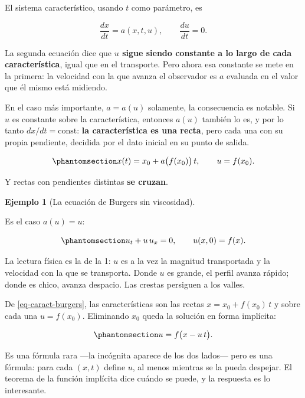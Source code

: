 \documentclass[
  spanish,
  a4paper,
]{scrbook}
\theoremstyle{definition}
\theoremstyle{plain}
\theoremstyle{definition}
\newtheorem{example}{Ejemplo}[chapter]
\theoremstyle{plain}
\theoremstyle{definition}
\theoremstyle{remark}
\begin{document}
El sistema característico, usando \(t\) como parámetro, es

\[
\frac{dx}{dt} = a(x,t,u), \qquad \frac{du}{dt} = 0 .
\]

La segunda ecuación dice que \textbf{\(u\) sigue siendo constante a lo
largo de cada característica}, igual que en el transporte. Pero ahora
esa constante se mete en la primera: la velocidad con la que avanza el
observador es \(a\) evaluada en el valor que él mismo está midiendo.

En el caso más importante, \(a = a(u)\) solamente, la consecuencia es
notable. Si \(u\) es constante sobre la característica, entonces
\(a(u)\) también lo es, y por lo tanto \(dx/dt = \text{const}\):
\textbf{la característica es una recta}, pero cada una con su propia
pendiente, decidida por el dato inicial en su punto de salida.

\begin{equation}\protect\phantomsection\label{eq-caract-burgers}{
x(t) = x_0 + a\big(f(x_0)\big)\,t , \qquad u = f(x_0) .
}\end{equation}

Y rectas con pendientes distintas \textbf{se cruzan}.

\begin{example}[La ecuación de Burgers sin
viscosidad]\protect\hypertarget{exm-burgers}{}\label{exm-burgers}

Es el caso \(a(u) = u\):

\begin{equation}\protect\phantomsection\label{eq-burgers}{
u_t + u\,u_x = 0, \qquad u(x,0) = f(x).
}\end{equation}

La lectura física es la de la 1: \(u\) es a la vez la magnitud
transportada y la velocidad con la que se transporta. Donde \(u\) es
grande, el perfil avanza rápido; donde es chico, avanza despacio. Las
crestas persiguen a los valles.

De \ref{eq-caract-burgers}, las características son las rectas
\(x = x_0 + f(x_0)\,t\) y sobre cada una \(u = f(x_0)\). Eliminando
\(x_0\) queda la solución en forma implícita:

\begin{equation}\protect\phantomsection\label{eq-burgers-implicita}{
u = f\big(x - u\,t\big) .
}\end{equation}

Es una fórmula rara ---la incógnita aparece de los dos lados--- pero es
una fórmula: para cada \((x,t)\) define \(u\), al menos mientras se la
pueda despejar. El teorema de la función implícita dice cuándo se puede,
y la respuesta es lo interesante.

\end{example}
\end{document}
